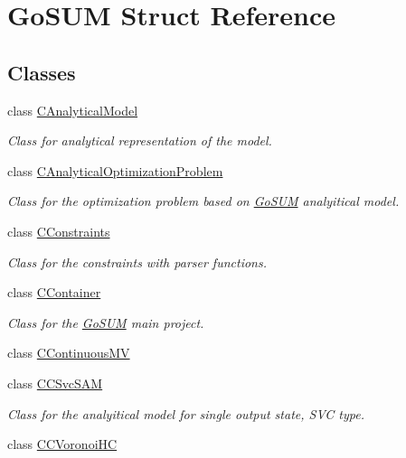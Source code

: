 \hypertarget{struct_go_s_u_m}{\section{Go\-S\-U\-M Struct Reference}
\label{struct_go_s_u_m}
}
\subsection*{Classes}
\begin{DoxyCompactItemize}
\item 
class \hyperlink{class_go_s_u_m_1_1_c_analytical_model}{C\-Analytical\-Model}
\begin{DoxyCompactList}\small\item\em Class for analytical representation of the model. \end{DoxyCompactList}\item 
class \hyperlink{class_go_s_u_m_1_1_c_analytical_optimization_problem}{C\-Analytical\-Optimization\-Problem}
\begin{DoxyCompactList}\small\item\em Class for the optimization problem based on \hyperlink{struct_go_s_u_m}{Go\-S\-U\-M} analyitical model. \end{DoxyCompactList}\item 
class \hyperlink{class_go_s_u_m_1_1_c_constraints}{C\-Constraints}
\begin{DoxyCompactList}\small\item\em Class for the constraints with parser functions. \end{DoxyCompactList}\item 
class \hyperlink{class_go_s_u_m_1_1_c_container}{C\-Container}
\begin{DoxyCompactList}\small\item\em Class for the \hyperlink{struct_go_s_u_m}{Go\-S\-U\-M} main project. \end{DoxyCompactList}\item 
class \hyperlink{class_go_s_u_m_1_1_c_continuous_m_v}{C\-Continuous\-M\-V}
\item 
class \hyperlink{class_go_s_u_m_1_1_c_c_svc_s_a_m}{C\-C\-Svc\-S\-A\-M}
\begin{DoxyCompactList}\small\item\em Class for the analyitical model for single output state, S\-V\-C type. \end{DoxyCompactList}\item 
class \hyperlink{class_go_s_u_m_1_1_c_c_voronoi_h_c}{C\-C\-Voronoi\-H\-C}

\end{DoxyCompactItemize}
